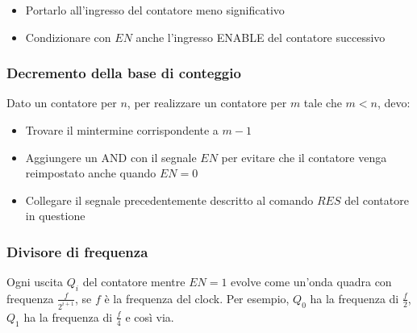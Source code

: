 \documentclass{article}
\begin{document}
\begin{itemize}
    \item Portarlo all'ingresso del contatore meno significativo
    \item Condizionare con $EN$ anche l'ingresso ENABLE del contatore successivo
\end{itemize}

\subsubsection{Decremento della base di conteggio}

Dato un contatore per $n$, per realizzare un contatore per $m$ tale che $m < n$, devo:

\begin{itemize}
    \item Trovare il mintermine corrispondente a $m-1$
    \item Aggiungere un AND con il segnale $EN$ per evitare che il contatore venga reimpostato anche quando $EN=0$
    \item Collegare il segnale precedentemente descritto al comando $RES$ del contatore in questione
\end{itemize}

\subsubsection{Divisore di frequenza}

Ogni uscita $Q_i$ del contatore mentre $EN=1$ evolve come un'onda quadra con frequenza $\frac{f}{2^{i+1}}$, se $f$ è la frequenza del clock.
Per esempio, $Q_0$ ha la frequenza di $\frac{f}{2}$, $Q_1$ ha la frequenza di $\frac{f}{4}$ e così via.
\end{document}
